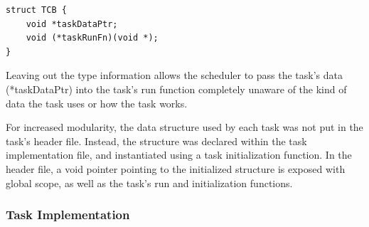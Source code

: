 \documentclass[12pt]{article} %
\begin{document}
\begin{lstlisting}[caption=TCB Construct, captionpos=b, label=lst:tcb]
struct TCB {
    void *taskDataPtr;
    void (*taskRunFn)(void *);
}
\end{lstlisting}
    Leaving out the type information allows the scheduler to pass the task's data
    (*taskDataPtr) into the task's run function completely unaware of the kind of
    data the task uses or how the task works.

    For increased modularity, the data structure used by each task was not put in
    the task's header file. Instead, the structure was declared within the task
    implementation file, and instantiated using a task initialization function. In
    the header file, a void pointer pointing to the initialized structure is
    exposed with global scope, as well as the task's run and initialization functions.

    \subsubsection{Task Implementation}

\end{document}
